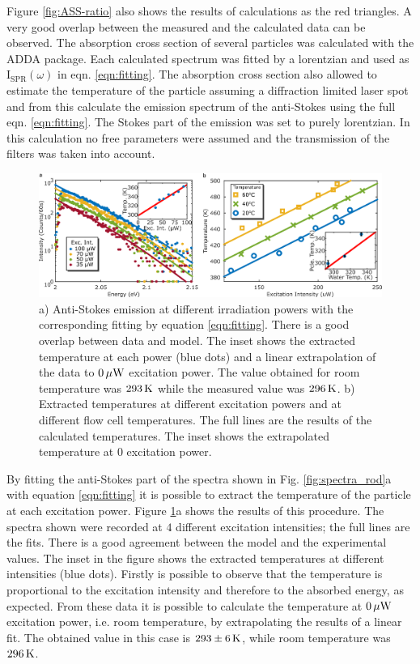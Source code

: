 Figure \ref{fig:ASS-ratio} also shows the results of calculations as the red
triangles. A very good overlap between the measured and the calculated data can
be observed. The absorption cross section of several particles was calculated
with the ADDA package. Each calculated spectrum was fitted by a lorentzian and
used as $\textrm{I}_{\textrm{SPR}}(\omega)$ in eqn.
\ref{eqn:fitting}. The absorption cross section also allowed to estimate the
temperature of the particle assuming a diffraction limited laser spot and from
this calculate the emission spectrum of the anti-Stokes using the full eqn.
\ref{eqn:fitting}. The Stokes part of the emission was set to purely lorentzian.
In this calculation no free parameters were assumed and the transmission of the
filters was taken into account.

\begin{figure}[htp] \centering
\includegraphics[width=\textwidth]{Chapters/04_Anti-Stokes/Figures/03_Fit_Of_AS/03_Log_Fit_AS.png}
\caption{a) Anti-Stokes emission at different irradiation powers with the
corresponding fitting by equation \ref{eqn:fitting}. There is a good overlap
between data and model. The inset shows the extracted temperature at each power
(blue dots) and a linear extrapolation of the data to $0\,\mu\textrm{W}$ excitation power.
The value obtained for room temperature was $293\,\textrm{K}$ while the measured value was
$296\,\textrm{K}$. b) Extracted temperatures at different excitation powers and at
different flow cell temperatures. The full lines are the results of the
calculated temperatures. The inset shows the extrapolated temperature at $0$
excitation power.}
	\label{fig:AS_in_Log}
\end{figure}

By fitting the anti-Stokes part of the spectra shown in Fig.
\ref{fig:spectra_rod}a with equation \ref{eqn:fitting} it is possible to extract
the temperature of the particle at each excitation power. Figure
\ref{fig:AS_in_Log}a shows the results of this procedure. The spectra shown were
recorded at $4$ different excitation intensities; the full lines are the fits.
There is a good agreement between the model and the experimental values. The
inset in the figure shows the extracted temperatures at different intensities
(blue dots). Firstly is possible to observe that the temperature is proportional
to the excitation intensity and therefore to the absorbed energy, as expected.
From these data it is possible to calculate the temperature at $0\,\mu\textrm{W}$ excitation
power, i.e. room temperature, by extrapolating the results of a linear fit. The
obtained value in this case is $293\pm 6 \,\textrm{K}$, while room temperature was
$296\,\textrm{K}$.

